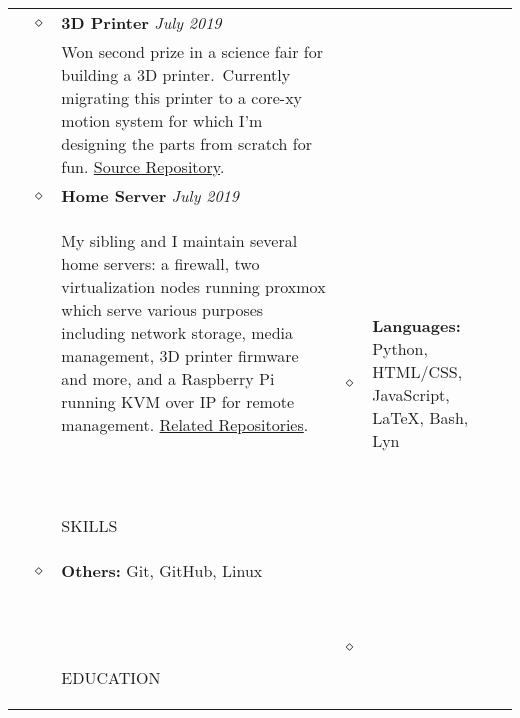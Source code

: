 \documentclass[11pt]{article}
\begin{document}
\begin{tabularx}{\textwidth}{@{}b{90px} b{9px}@{} X@{}}
        \\ & $\diamond$ &

        \textbf{3D Printer} \hfill \textit{July 2019} \\ & &
        Won second prize in a science fair for building a 3D printer.\ Currently migrating this printer to a core-xy
        motion system for which I'm designing the parts from scratch for fun.
        \href{https://github.com/xserv-labs/cad}{\color{blue}Source Repository}.

        \\ & $\diamond$ &

        \textbf{Home Server} \hfill \textit{July 2019} \\ & &
        My sibling and I maintain several home servers: a firewall, two virtualization nodes running proxmox which
        serve various purposes including network storage, media management, 3D printer firmware and more, and a
        Raspberry Pi running KVM over IP for remote management.
        \href{https://github.com/xserv-labs}{\color{blue}Related Repositories}.\

        \iftoggle{lines}{\\ \\ \hline \\}{\\ \\}


        \lettrine[lines=1,loversize=-0.5]{S}KILLS & $\diamond$ &

        \textbf{Languages:} Python, HTML/CSS, JavaScript, \LaTeX, Bash, Lyn & &

        \\ & $\diamond$ &

        \textbf{Others:} Git, GitHub, Linux \\ & &

        \iftoggle{lines}{\\ \\ \hline \\}{\\ \\}


        \lettrine[lines=1,loversize=-0.5]{E}DUCATION & $\diamond$ &


\end{tabularx}
\end{document}
